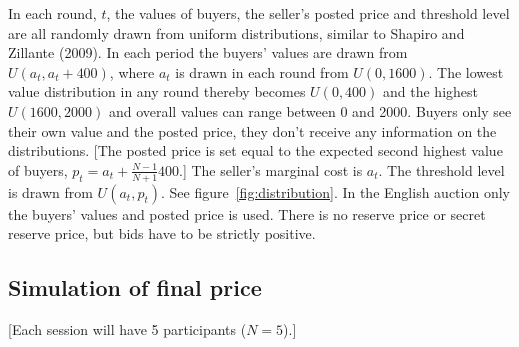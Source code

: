 \documentclass[a4paper,12pt]{article}
\begin{document}
	In each round, $t$, the values of buyers, the seller's posted price and threshold level are all randomly drawn from uniform distributions, similar to Shapiro and Zillante (2009). In each period the buyers' values are drawn from $U(a_t , a_t + 400)$, where $a_t$ is drawn in each round from $U(0, 1600)$. The lowest value distribution in any round thereby becomes $U(0, 400)$ and the highest $U(1600, 2000)$ and overall values can range between 0 and 2000. Buyers only see their own value and the posted price, they don't receive any information on the distributions. [The posted price is set equal to the expected second highest value of buyers, $p_t = a_t + \frac{N-1}{N+1}400$.] The seller's marginal cost is $a_t$. The threshold level is drawn from $U(a_t, p_t)$. See figure~\ref{fig:distribution}. In the English auction only the buyers' values and posted price is used. There is no reserve price or secret reserve price, but bids have to be strictly positive.
	
	\subsection{Simulation of final price}
	[Each session will have 5 participants ($N=5$).]
\end{document}
